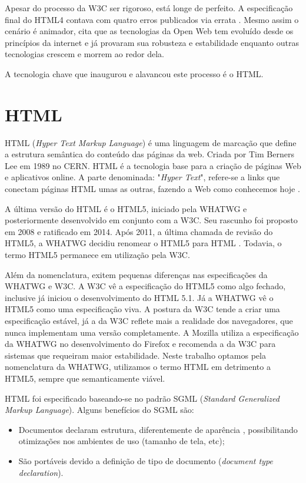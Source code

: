 Apesar do processo da W3C ser rigoroso, está longe de perfeito. A
especificação final do HTML4 contava com quatro erros publicados
via errata \autocite{diveIntohtml}. Mesmo assim o cenário é animador,
\citet{html5mostwanted} cita que as tecnologias da Open Web tem
evoluído desde os princípios da internet e já provaram sua robusteza
e estabilidade enquanto outras tecnologias crescem e morrem ao redor
dela.

A tecnologia chave que inaugurou e alavancou este processo é o HTML.
\section{HTML}

HTML (\textit{Hyper Text Markup Language}) é uma linguagem de
marcação que define a estrutura semântica do conteúdo das páginas
da web. Criada por Tim Berners Lee em 1989 no CERN. HTML é a tecnologia
base para a criação de páginas Web e aplicativos online. A parte
denominada: "\textit{Hyper Text}", refere-se a links que conectam
páginas HTML umas as outras, fazendo a Web como conhecemos hoje
\autocite{mdn2015}.

A última versão do HTML é o HTML5, iniciado pela WHATWG e
posteriormente desenvolvido em conjunto com a W3C. Seu rascunho foi
proposto em 2008 e ratificado em 2014. Após 2011, a última chamada
de revisão do HTML5, a WHATWG decidiu renomear o HTML5 para HTML
\autocite{htmlIsTheNewHtml5}. Todavia, o termo HTML5 permanece em
utilização pela W3C.

Além da nomenclatura, exitem pequenas diferenças nas especificações
da WHATWG e W3C. A W3C vê a especificação do HTML5 como algo fechado,
inclusive já iniciou o desenvolvimento do HTML 5.1. Já a WHATWG vê o
HTML5 como uma especificação viva. A postura da W3C tende a criar uma
especificação estável, já a da W3C reflete mais a realidade dos
navegadores, que nunca implementam uma versão completamente. A Mozilla
utiliza a especificação da WHATWG no desenvolvimento do Firefox e
recomenda a da W3C para sistemas que requeiram maior estabilidade. Neste
trabalho optamos pela nomenclatura da WHATWG, utilizamos o termo HTML em
detrimento a HTML5, sempre que semanticamente viável.

HTML foi especificado baseando-se no padrão SGML (\textit{Standard Generalized
Markup Language}). Alguns benefícios do SGML são:

\begin{itemize}
    \item Documentos declaram estrutura, diferentemente de aparência
, possibilitando otimizações nos ambientes de uso (tamanho de tela,
etc);
    \item São portáveis devido a definição de tipo de documento
(\textit{document type declaration}).
\end{itemize}


